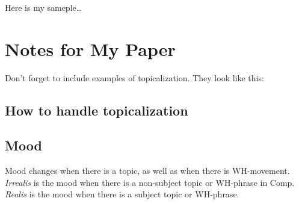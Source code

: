 \documentclass[12pt]{article}
\begin{document}
Here is my sameple\dots




\section*{Notes for My Paper}

Don't forget to include examples of topicalization.
They look like this:

{\small
{}
}

\subsection*{How to handle topicalization}




\subsection*{Mood}

Mood changes when there is a topic, as well as when
there is WH-movement.  \emph{Irrealis} is the mood when
there is a non-subject topic or WH-phrase in Comp.
\emph{Realis} is the mood when there is a subject topic
or WH-phrase.
\end{document}
